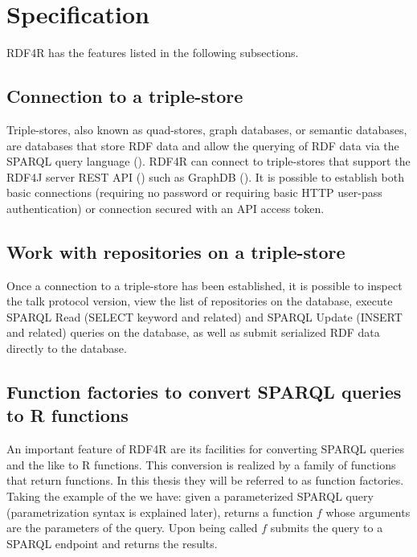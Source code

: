\section{Specification}

RDF4R has the features listed in the following subsections.

\subsection{Connection to a triple-store}

Triple-stores, also known as quad-stores, graph databases, or semantic databases, are databases that store RDF data and allow the querying of RDF data via the SPARQL query language (\cite{the_w3c_sparql_working_group_sparql_2013}). RDF4R can connect to triple-stores that support the RDF4J server REST API (\cite{rdf4j_development_team_rdf4j_2017}) such as GraphDB (\cite{ontotext_graphdb_2018}). It is possible to establish both basic connections (requiring no password or requiring basic HTTP user-pass authentication) or connection secured with an API access token.

\subsection{Work with repositories on a triple-store}

Once a connection to a triple-store has been established, it is possible to inspect the talk protocol version, view the list of repositories on the database, execute SPARQL Read (SELECT keyword and related) and SPARQL Update (INSERT and related) queries on the database, as well as submit serialized RDF data directly to the database.

\subsection{Function factories to convert SPARQL queries to R functions}

An important feature of RDF4R are its facilities for converting SPARQL queries and the like to R functions. This conversion is realized by a family of functions that return functions. In this thesis they will be referred to as function factories. Taking the example of the  we have: given a parameterized SPARQL query (parametrization syntax is explained later),  returns a function $f$ whose arguments are the parameters of the query. Upon being called $f$ submits the query to a SPARQL endpoint and returns the results.

